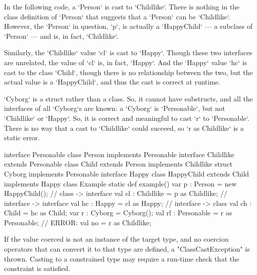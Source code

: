 \begin{ex}
In the following code, a \xcd`Person` is cast to \xcd`Childlike`.  There is
nothing in the class definition of \xcd`Person` that suggests that a
\xcd`Person` can be \xcd`Childlike`.  However, the \xcd`Person` in question,
\xcd`p`, is actually a \xcd`HappyChild` --- a subclass of \xcd`Person` --- and
is, in fact, \xcd`Childlike`.  

Similarly, the \xcd`Childlike` value \xcd`cl` is cast to \xcd`Happy`.  Though
these two interfaces are unrelated, the value of \xcd`cl` is, in fact,
\xcd`Happy`.  And the \xcd`Happy` value \xcd`hc` is cast to the class
\xcd`Child`, though there is no relationship between the two, but the actual
value is a \xcd`HappyChild`, and thus the cast is correct at runtime.

\xcd`Cyborg` is a struct rather than a class.  So, it cannot have substructs,
and all the interfaces of all \xcd`Cyborg`s are known: a \xcd`Cyborg` is
\xcd`Personable`, but not \xcd`Childlike` or \xcd`Happy`.  So, it is correct
and meaningful to cast \xcd`r` to \xcd`Personable`.  There is no way that a
cast to \xcd`Childlike` could succeed, so \xcd`r as Childlike` is a static error.

\begin{xten}
interface Personable {}
class Person implements Personable {}
interface Childlike extends Personable {}
class Child extends Person implements Childlike {}
struct Cyborg implements Personable {}
interface Happy {}
class HappyChild extends Child implements Happy {}
class Example {
  static def example() {
    var p : Person = new HappyChild();
    // class -> interface
    val cl : Childlike = p as Childlike; 
    // interface -> interface
    val hc : Happy = cl as Happy; 
    // interface -> class
    val ch : Child = hc as Child; 
    var r : Cyborg = Cyborg();
    val rl : Personable = r as Personable; 
    // ERROR: val no = r as Childlike;
  }
}
\end{xten}




\end{ex}


If the value coerced is not an instance of the target type,
and no coercion operators that can convert it to that type are defined, 
a \xcd"ClassCastException" is thrown.  Casting to a constrained
type may require a run-time check that the constraint is
satisfied.


